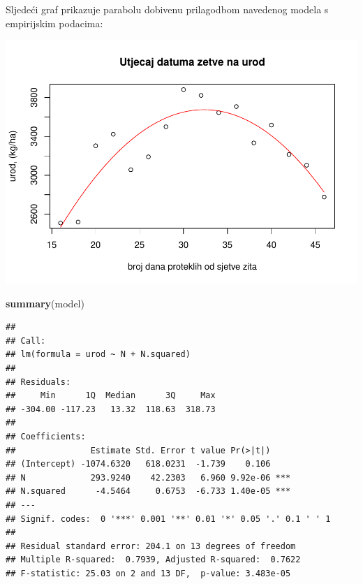 \documentclass[]{article}
\newenvironment{Shaded}{\begin{snugshade}}{\end{snugshade}}
\newcommand{\KeywordTok}[1]{\textcolor[rgb]{0.13,0.29,0.53}{\textbf{{#1}}}}
\newcommand{\DataTypeTok}[1]{\textcolor[rgb]{0.13,0.29,0.53}{{#1}}}
\newcommand{\DecValTok}[1]{\textcolor[rgb]{0.00,0.00,0.81}{{#1}}}
\newcommand{\StringTok}[1]{\textcolor[rgb]{0.31,0.60,0.02}{{#1}}}
\newcommand{\OtherTok}[1]{\textcolor[rgb]{0.56,0.35,0.01}{{#1}}}
\newcommand{\NormalTok}[1]{{#1}}
\begin{document}
Sljedeći graf prikazuje parabolu dobivenu prilagodbom navedenog modela s
empirijskim podacima:

\begin{Shaded}
\end{Shaded}

\includegraphics{Izvjestaj_files/figure-latex/unnamed-chunk-18-1.pdf}

\begin{Shaded}
\begin{Highlighting}[]
\KeywordTok{summary}\NormalTok{(model)}
\end{Highlighting}
\end{Shaded}

\begin{verbatim}
## 
## Call:
## lm(formula = urod ~ N + N.squared)
## 
## Residuals:
##     Min      1Q  Median      3Q     Max 
## -304.00 -117.23   13.32  118.63  318.73 
## 
## Coefficients:
##               Estimate Std. Error t value Pr(>|t|)    
## (Intercept) -1074.6320   618.0231  -1.739    0.106    
## N             293.9240    42.2303   6.960 9.92e-06 ***
## N.squared      -4.5464     0.6753  -6.733 1.40e-05 ***
## ---
## Signif. codes:  0 '***' 0.001 '**' 0.01 '*' 0.05 '.' 0.1 ' ' 1
## 
## Residual standard error: 204.1 on 13 degrees of freedom
## Multiple R-squared:  0.7939, Adjusted R-squared:  0.7622 
## F-statistic: 25.03 on 2 and 13 DF,  p-value: 3.483e-05
\end{verbatim}
\end{document}
